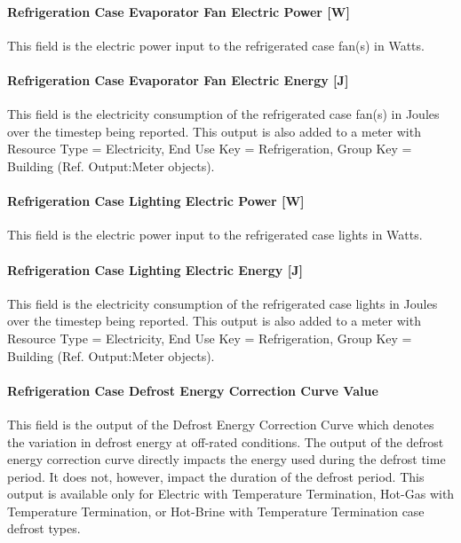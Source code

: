 \paragraph{Refrigeration Case Evaporator Fan Electric Power {[}W{]}}\label{refrigeration-case-evaporator-fan-electric-power-w}

This field is the electric power input to the refrigerated case fan(s) in Watts.

\paragraph{Refrigeration Case Evaporator Fan Electric Energy {[}J{]}}\label{refrigeration-case-evaporator-fan-electric-energy-j}

This field is the electricity consumption of the refrigerated case fan(s) in Joules over the timestep being reported. This output is also added to a meter with Resource Type = Electricity, End Use Key = Refrigeration, Group Key = Building (Ref. Output:Meter objects).

\paragraph{Refrigeration Case Lighting Electric Power {[}W{]}}\label{refrigeration-case-lighting-electric-power-w}

This field is the electric power input to the refrigerated case lights in Watts.

\paragraph{Refrigeration Case Lighting Electric Energy {[}J{]}}\label{refrigeration-case-lighting-electric-energy-j}

This field is the electricity consumption of the refrigerated case lights in Joules over the timestep being reported. This output is also added to a meter with Resource Type = Electricity, End Use Key = Refrigeration, Group Key = Building (Ref. Output:Meter objects).

\paragraph{Refrigeration Case Defrost Energy Correction Curve Value}\label{refrigeration-case-defrost-energy-correction-curve-value}

This field is the output of the Defrost Energy Correction Curve which denotes the variation in defrost energy at off-rated conditions. The output of the defrost energy correction curve directly impacts the energy used during the defrost time period. It does not, however, impact the duration of the defrost period. This output is available only for Electric with Temperature Termination, Hot-Gas with Temperature Termination, or Hot-Brine with Temperature Termination case defrost types.

